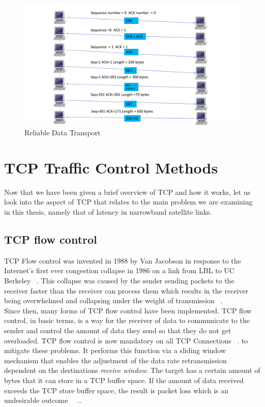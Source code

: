 \begin{figure}[h]
    \centering
    \includegraphics[width=1.1\textwidth]{ACK.pdf}
    \caption{Reliable Data Transport}
    \label{Reliable}
\end{figure}

\section{TCP Traffic Control Methods}\label{TCP Traffic Control}
Now that we have been given a brief overview of TCP and how it works, let us look into the aspect of TCP that relates to the main problem we are examining in this thesis, namely that of latency in narrowband satellite links. 

\subsection{TCP flow control}\label{TCP Flow Control}
TCP Flow control was invented in 1988 by Van Jacobson in response to the Internet's first ever congestion collapse in 1986 on a link from LBL to UC Berkeley ~\cite{19}. This collapse was caused by the sender sending packets to the receiver faster than the receiver can process them which results in the receiver being overwhelmed and collapsing under the weight of transmission ~\cite{19}. \\

Since then, many forms of TCP flow control have been implemented. TCP flow control, in basic terms, is a way for the receiver of data to communicate to the sender and control the amount of data they send so that they do not get overloaded. TCP flow control is now mandatory on all TCP Connections ~\cite{1}. to mitigate these problems. It performs this function via a sliding window mechanism that enables the adjustment of the data rate retransmission dependent on the destinations \emph{receive window}. The target has a certain amount of bytes that it can store in a TCP buffer space. If the amount of data received exceeds the TCP store buffer space, the result is packet loss which is an undesirable outcome ~\cite{1}~\cite{19}.. \\



